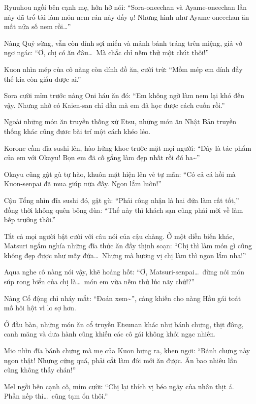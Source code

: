 \documentclass[../main.tex]{subfiles}
\begin{document}
Ryuuhou ngồi bên cạnh mẹ, hớn hở nói: ``Sora-oneechan và Ayame-oneechan lần này đã trổ tài làm món nem rán này đấy ạ! Nhưng hình như Ayame-oneechan ăn mất nửa số nem rồi\dots''

Nàng Quỷ sừng, vẫn còn dính sợi miến và mảnh bánh tráng trên miệng, giả vờ ngơ ngác: ``Ơ, chị có ăn đâu\dots\ Mà chắc chỉ nếm thử một chút thôi!''

Kuon nhìn mép của cô nàng còn dính đồ ăn, cười trừ: ``Mồm mép em dính đầy thế kia còn giấu được ai.''

Sora cười mỉm trước nàng Oni háu ăn đó: ``Em không ngờ làm nem lại khó đến vậy. Nhưng nhờ có Kaien-san chỉ dẫn mà em đã học được cách cuốn rồi.''

Ngoài những món ăn truyền thống xứ Etsu, những món ăn Nhật Bản truyền thống khác cũng đươc bài trí một cách khéo léo.

Korone cầm đĩa sushi lên, hào hứng khoe trước mặt mọi người: ``Đây là tác phẩm của em với Okayu! Bọn em đã cố gắng làm đẹp nhất rồi đó ha\~{}''

Okayu cũng gật gù tự hào, khuôn mặt hiện lên vẻ tự mãn: ``Có cả cá hồi mà Kuon-senpai đã mua giúp nữa đấy. Ngon lắm luôn!''

Cậu Tổng nhìn đĩa sushi đó, gật gù: ``Phải công nhận là hai đứa làm rất tốt,'' đồng thời không quên bông đùa: ``Thế này thì khách sạn cũng phải mời về làm bếp trưởng thôi.''

Tất cả mọi người bật cười với câu nói của cậu chàng. Ở một diễn biến khác, Matsuri ngắm nghía những đĩa thức ăn đầy thịnh soạn: ``Chị thì làm món gì cũng không đẹp được như mấy đứa\dots\ Nhưng mà hương vị chị làm thì ngon lắm nha!''

Aqua nghe cô nàng nói vậy, khẽ hoảng hốt: ``Ơ, Matsuri-senpai\dots\ đừng nói món súp rong biển của chị là\dots\ món em vừa nếm thử lúc nãy chứ!?''

Nàng Cổ động chỉ nháy mắt: ``Đoán xem\~{}'', càng khiến cho nàng Hầu gái toát mồ hôi hột vì lo sợ hơn.

Ở đầu bàn, những món ăn cổ truyền Etsunan khác như bánh chưng, thịt đông, canh măng và dưa hành cũng khiến các cô gái không khỏi ngạc nhiên.

Mio nhìn đĩa bánh chưng mà mẹ của Kuon bưng ra, khen ngợi: ``Bánh chưng này ngon thật! Nhưng cứng quá, phải cắt làm đôi mới ăn được. Ăn bao nhiêu lần cũng không thấy chán!''

Mel ngồi bên cạnh cô, mỉm cười: ``Chị lại thích vị béo ngậy của nhân thịt á. Phần nếp thì\dots\ cũng tạm ổn thôi.''
\end{document}
